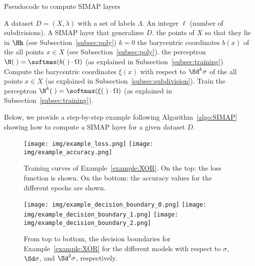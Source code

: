 \begin{algorithm}
\caption{Pseudocode to compute  SIMAP layers }
\label{algo:SIMAP}
 \begin{algorithmic}
 
A dataset $D=(X,\lambda)$ 
with a set of labels $\Lambda$. \STATE \hspace{1cm} An integer $\ell$ (number of subdivisions).
 A SIMAP layer that generalizes $D$.
\STATE
 the points of $X$ so that they lie in $\Hh$
(see Subsection~\ref{subsec:poly})
\ENDIF
\STATE $k=0$
 the barycentric coordinates $b(x)$ of the all points $x\in X$ (see Subsection~\ref{subsec:poly}).
 the perceptron 
$\N(\;)=\softmax(b(\;)\cdot \Omega)$ (as explained in Subsection~\ref{subsec:training}).
\STATE  Compute the barycentric coordinates $\xi(x)$ with respect to $\Sd^{k}\sigma$ of the all points $x\in X$ (as explained in Subsection~\ref{subsec:subdivision}). 
\STATE Train the perceptron 
$\N^{k}(\;)=\softmax(\xi(\;)\cdot \Omega)$ (as explained in Subsection~\ref{subsec:training}).
\ENDWHILE
 \end{algorithmic}
\end{algorithm}

 
Below, we provide a step-by-step example following Algorithm~\ref{algo:SIMAP}
showing how to compute a SIMAP layer for a given dataset $D$.

\begin{figure}[ht]
    \centering
    \texttt{[image: img/example\_loss.png]}
\texttt{[image: img/example\_accuracy.png]}
    \caption{Training curves of Example~\ref{example:XOR}. On the top: the loss function is shown. On the bottom: the accuracy values for the different epochs are shown.}
    \label{fig:example_loss_acc}
\end{figure}

\begin{figure}[ht]
    \centering
    \texttt{[image: img/example\_decision\_boundary\_0.png]}
\texttt{[image: img/example\_decision\_boundary\_1.png]}
\texttt{[image: img/example\_decision\_boundary\_2.png]}
    \caption{From top to bottom, the decision boundaries for Example~\ref{example:XOR} for the different models with respect to $\sigma$, $\Sd \sigma$, and $\Sd^2 \sigma$, respectively.}
    \label{fig:decision_boundary}
\end{figure}

